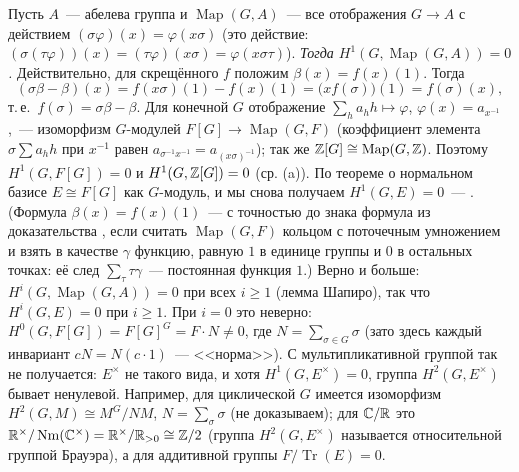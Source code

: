 \begin{aside}
Пусть $A$~--- абелева группа и $\operatorname{Map}(G,A)$~--- все отображения $G\to A$ с действием $(\sigma\varphi)(x)=\varphi(x\sigma)$
(это действие: $(\sigma(\tau\varphi))(x)=(\tau\varphi)(x\sigma)=\varphi(x\sigma\tau)$). \emph{Тогда $H^1(G,\operatorname{Map}(G,A))=0$.}
Действительно, для скрещённого $f$ положим $\beta(x)=f(x)(1)$. Тогда
\[
(\sigma\beta-\beta)(x)=f(x\sigma)(1)-f(x)(1)=\bigl(xf(\sigma)\bigr)(1)=f(\sigma)(x),
\]
т.\,е.\ $f(\sigma)=\sigma\beta-\beta$. Для конечной $G$ отображение $\sum_ha_hh\mapsto\varphi$, $\varphi(x)=a_{x^{-1}}$,~---
изоморфизм $G$-модулей $F[G]\to\operatorname{Map}(G,F)$ (коэффициент элемента $\sigma\sum a_hh$ при $x^{-1}$ равен
$a_{\sigma^{-1}x^{-1}}=a_{(x\sigma)^{-1}}$); так же $\mathbb Z[G]\cong\operatorname{Map}(G,\mathbb Z)$. Поэтому $H^1(G,F[G])=0$ и
$H^1(G,\mathbb Z[G])=0$ (ср. (a)). По теореме о нормальном базисе $E\cong F[G]$ как $G$-модуль, и мы снова получаем
$H^1(G,E)=0$~--- . (Формула $\beta(x)=f(x)(1)$~--- с точностью до знака формула из доказательства , если считать
$\operatorname{Map}(G,F)$ кольцом с поточечным умножением и взять в качестве $\gamma$ функцию, равную $1$ в единице
группы и $0$ в остальных точках: её след $\sum_\tau\tau\gamma$~--- постоянная функция $1$.) Верно и больше: $H^i(G,\operatorname{Map}(G,A))=0$ при всех $i\ge1$ (лемма Шапиро), так что
$H^i(G,E)=0$ при $i\ge1$. При $i=0$ это неверно: $H^0(G,F[G])=F[G]^G=F\cdot N\ne0$, где $N=\sum_{\sigma\in G}\sigma$ (зато здесь каждый
инвариант $cN=N(c\cdot1)$~--- <<норма>>). С мультипликативной группой так не получается: $E^\times$ не такого вида, и хотя
$H^1(G,E^\times)=0$, группа $H^2(G,E^\times)$ бывает ненулевой. Например, для циклической $G$ имеется изоморфизм
$H^2(G,M)\cong M^G/NM$, $N=\sum_\sigma\sigma$ (не доказываем); для $\mathbb C/\mathbb R$ это $\mathbb R^\times/\operatorname{Nm}(\mathbb C^\times)=\mathbb R^\times/\mathbb R_{>0}\cong\mathbb Z/2$ (группа $H^2(G,E^\times)$ называется
относительной группой Брауэра),
а для аддитивной группы $F/\operatorname{Tr}(E)=0$.
\end{aside}
